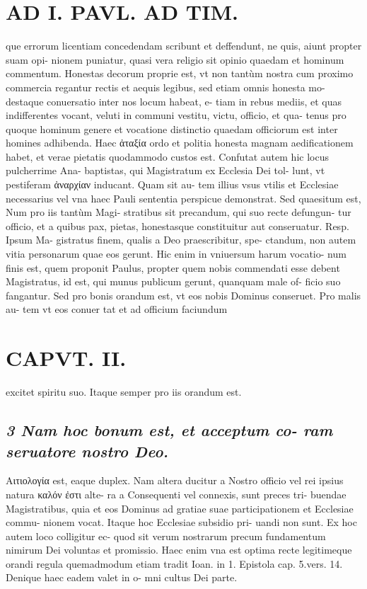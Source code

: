 \documentclass{article}
\begin{document}
\begin{pages}
\section*{AD I. PAVL. AD TIM. }
\marginpar{[ p.50 ]}\pstart que errorum licentiam concedendam scribunt et deffendunt, ne quis, aiunt propter suam opi- nionem puniatur, quasi vera religio sit opinio quaedam et hominum commentum.  \pend\pstart Honestas decorum proprie est, vt non tantùm nostra cum proximo commercia regantur rectis et aequis legibus, sed etiam omnis honesta mo- destaque conuersatio inter nos locum habeat, e- tiam in rebus mediis, et quas indifferentes vocant, veluti in communi vestitu, victu, officio, et qua- tenus pro quoque hominum genere et vocatione distinctio quaedam officiorum est inter homines adhibenda. Haec ἀταξία ordo et politia honesta magnam aedificationem habet, et verae pietatis quodammodo custos est.  \pend\pstart Confutat autem hic locus pulcherrime Ana- baptistas, qui Magistratum ex Ecclesia Dei tol- lunt, vt pestiferam ἀναρχίαν inducant. Quam sit au- tem illius vsus vtilis et Ecclesiae necessarius vel vna haec Pauli sententia perspicue demonstrat.  \pend\pstart Sed quaesitum est, Num pro iis tantùm Magi- stratibus sit precandum, qui suo recte defungun- tur officio, et a quibus pax, pietas, honestasque constituitur aut conseruatur. Resp. Ipsum Ma- gistratus finem, qualis a Deo praescribitur, spe- ctandum, non autem vitia personarum quae eos gerunt. Hic enim in vniuersum harum vocatio- num finis est, quem proponit Paulus, propter quem nobis commendati esse debent Magistratus, id est, qui munus publicum gerunt, quanquam male of- ficio suo fangantur. Sed pro bonis orandum est, vt eos nobis Dominus conseruet. Pro malis au- tem vt eos conuer tat et ad officium faciundum  \pend
\section*{CAPVT. II. }
\marginpar{[ p.51 ]}\pstart excitet spiritu suo. Itaque  semper pro iis orandum est.  \pend
{}
{}
\subsection*{\textit{3 Nam hoc bonum est, et acceptum co- ram seruatore nostro Deo. }}\pstart Αιτιολογία est, eaque duplex. Nam altera ducitur a Nostro officio vel rei ipsius natura καλόν ἐστι alte- ra a Consequenti vel connexis, sunt preces tri- buendae Magistratibus, quia et eos Dominus ad gratiae suae participationem et Ecclesiae commu- nionem vocat. Itaque hoc Ecclesiae subsidio pri- uandi non sunt. Ex hoc autem loco colligitur ec- quod sit verum nostrarum precum fundamentum nimirum Dei voluntas et promissio. Haec enim vna est optima recte legitimeque orandi regula quemadmodum etiam tradit Ioan. in 1. Epistola cap. 5.vers. 14. Denique haec eadem valet in o- mni cultus Dei parte.  \pend
{}
{}

\end{pages}
\end{document}
